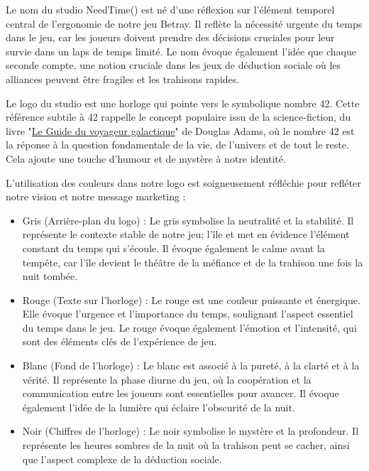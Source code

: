\documentclass[
	article,			%
	11pt,				%
	oneside,			%
	a4paper,			%
	chapter=TITLE,
	french,			%
	sumario=tradicional
	]{base_nt}
\begin{document}
Le nom du studio NeedTime() est né d'une réflexion sur l'élément temporel central de l'ergonomie de notre jeu Betray. Il reflète la nécessité urgente du temps dans le jeu, car les joueurs doivent prendre des décisions cruciales pour leur survie dans un laps de temps limité. Le nom évoque également l'idée que chaque seconde compte, une notion cruciale dans les jeux de déduction sociale où les alliances peuvent être fragiles et les trahisons rapides.

Le logo du studio est une horloge qui pointe vers le symbolique nombre 42. Cette référence subtile à 42 rappelle le concept populaire issu de la science-fiction, du livre "\href{https://fr.wikipedia.org/wiki/La_grande_question_sur_la_vie,_l%27Univers_et_le_reste}{Le Guide du voyageur galactique}" de Douglas Adams, où le nombre 42 est la réponse à la question fondamentale de la vie, de l'univers et de tout le reste. Cela ajoute une touche d'humour et de mystère à notre identité.

L'utilisation des couleurs dans notre logo est soigneusement réfléchie pour refléter notre vision et notre message marketing :

\begin{itemize}
    \item Gris (Arrière-plan du logo) : Le gris symbolise la neutralité et la stabilité. Il représente le contexte stable de notre jeu; l'île et met en évidence l'élément constant du temps qui s'écoule. Il évoque également le calme avant la tempête, car l'île devient le théâtre de la méfiance et de la trahison une fois la nuit tombée.
    \item Rouge (Texte sur l'horloge) : Le rouge est une couleur puissante et énergique. Elle évoque l'urgence et l'importance du temps, soulignant l'aspect essentiel du temps dans le jeu. Le rouge évoque également l'émotion et l'intensité, qui sont des éléments clés de l'expérience de jeu.
    \item Blanc (Fond de l'horloge) : Le blanc est associé à la pureté, à la clarté et à la vérité. Il représente la phase diurne du jeu, où la coopération et la communication entre les joueurs sont essentielles pour avancer. Il évoque également l'idée de la lumière qui éclaire l'obscurité de la nuit.
    \item Noir (Chiffres de l'horloge) : Le noir symbolise le mystère et la profondeur. Il représente les heures sombres de la nuit où la trahison peut se cacher, ainsi que l'aspect complexe de la déduction sociale.
\end{itemize}
\end{document}
